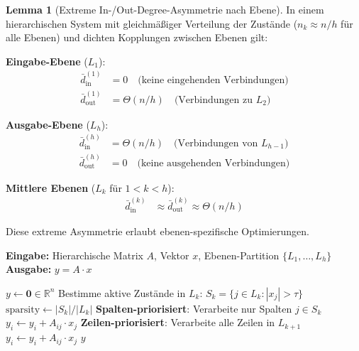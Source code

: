 ﻿\documentclass[a4paper,12pt]{report}
\theoremstyle{definition}
\newtheorem{lemma}{Lemma}
\begin{document}
	\begin{lemma}[Extreme In-/Out-Degree-Asymmetrie nach Ebene]
		In einem hierarchischen System mit gleichmäßiger Verteilung der Zustände ($n_k \approx n/h$ für alle Ebenen) und dichten Kopplungen zwischen Ebenen gilt:
		
		\textbf{Eingabe-Ebene} ($L_1$):
		\begin{align}
			\bar{d}_{\text{in}}^{(1)} &= 0 \quad \text{(keine eingehenden Verbindungen)} \\
			\bar{d}_{\text{out}}^{(1)} &= \Theta(n/h) \quad \text{(Verbindungen zu } L_2\text{)}
		\end{align}
		
		\textbf{Ausgabe-Ebene} ($L_h$):
		\begin{align}
			\bar{d}_{\text{in}}^{(h)} &= \Theta(n/h) \quad \text{(Verbindungen von } L_{h-1}\text{)} \\
			\bar{d}_{\text{out}}^{(h)} &= 0 \quad \text{(keine ausgehenden Verbindungen)}
		\end{align}
		
		\textbf{Mittlere Ebenen} ($L_k$ für $1 < k < h$):
		\begin{align}
			\bar{d}_{\text{in}}^{(k)} &\approx \bar{d}_{\text{out}}^{(k)} \approx \Theta(n/h)
		\end{align}
	\end{lemma}
	
	Diese extreme Asymmetrie erlaubt ebenen-spezifische Optimierungen.
	
	\begin{algorithm}[H]
		\caption{Ebenen-adaptive Matrix-Vektor-Multiplikation}
		\label{alg:layer-adaptive}
		\textbf{Eingabe:} Hierarchische Matrix $A$, Vektor $x$, Ebenen-Partition $\{L_1, \ldots, L_h\}$ \\
		\textbf{Ausgabe:} $y = A \cdot x$
		\begin{algorithmic}[1]
			\State $y \gets \mathbf{0} \in \mathbb{R}^n$
			\State Bestimme aktive Zustände in $L_k$: $S_k = \{j \in L_k : |x_j| > \tau\}$
			\State $\text{sparsity} \gets |S_k| / |L_k|$
			\State \textbf{Spalten-priorisiert}: Verarbeite nur Spalten $j \in S_k$
			\State $y_i \gets y_i + A_{ij} \cdot x_j$
			\EndFor
			\EndFor
			\Else
			\State \textbf{Zeilen-priorisiert}: Verarbeite alle Zeilen in $L_{k+1}$
			\State $y_i \gets y_i + A_{ij} \cdot x_j$
			\EndFor
			\EndFor
			\EndIf
			\EndFor
			\State \Return $y$
		\end{algorithmic}
	\end{algorithm}
	
\end{document}
